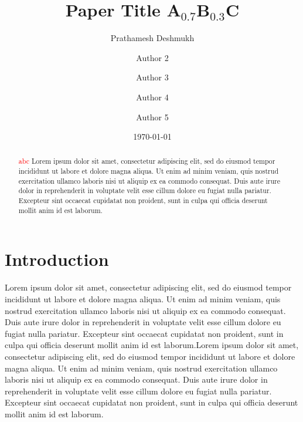\documentclass[final,3p,times,twocolumn]{elsarticle}
\begin{document}
\begin{frontmatter} 

\title{Paper Title A$_{0.7}$B$_{0.3}$C}

\author[1]{Prathamesh Deshmukh}
\author[1]{Author 2}
\author[1]{Author 3}
\author[1]{Author 4}
\author[1]{Author 5}


\date{\today}

\begin{abstract}
\textcolor{red}{abc}
Lorem ipsum dolor sit amet, consectetur adipiscing elit, sed do eiusmod tempor incididunt ut labore et dolore magna aliqua. Ut enim ad minim veniam, quis nostrud exercitation ullamco laboris nisi ut aliquip ex ea commodo consequat. Duis aute irure dolor in reprehenderit in voluptate velit esse cillum dolore eu fugiat nulla pariatur. Excepteur sint occaecat cupidatat non proident, sunt in culpa qui officia deserunt mollit anim id est laborum.
\end{abstract}
\end{frontmatter}

 \begin{comment}

Lorem ipsum dolor sit amet, consectetur adipiscing elit, sed do eiusmod tempor incididunt ut labore et dolore magna aliqua. Ut enim ad minim veniam, quis nostrud exercitation ullamco laboris nisi ut aliquip ex ea commodo consequat. Duis aute irure dolor in reprehenderit in voluptate velit esse cillum dolore eu fugiat nulla pariatur. Excepteur sint occaecat cupidatat non proident, sunt in culpa qui officia deserunt mollit anim id est laborum.
    
\end{comment}




\section{Introduction}

Lorem ipsum dolor sit amet, consectetur adipiscing elit, sed do eiusmod tempor incididunt ut labore et dolore magna aliqua. Ut enim ad minim veniam, quis nostrud exercitation ullamco laboris nisi ut aliquip ex ea commodo consequat. Duis aute irure dolor in reprehenderit in voluptate velit esse cillum dolore eu fugiat nulla pariatur. Excepteur sint occaecat cupidatat non proident, sunt in culpa qui officia deserunt mollit anim id est laborum.Lorem ipsum dolor sit amet, consectetur adipiscing elit, sed do eiusmod tempor incididunt ut labore et dolore magna aliqua. Ut enim ad minim veniam, quis nostrud exercitation ullamco laboris nisi ut aliquip ex ea commodo consequat. Duis aute irure dolor in reprehenderit in voluptate velit esse cillum dolore eu fugiat nulla pariatur. Excepteur sint occaecat cupidatat non proident, sunt in culpa qui officia deserunt mollit anim id est laborum.\cite{shimizu_magnetic_2003}
\end{document}
